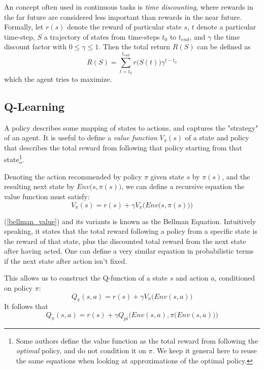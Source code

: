 An concept often used in continuous tasks is \textit{time discounting}, where rewards in the far future are considered less important than rewards in the near future. Formally, let $r(s)$ denote the reward of particular state $s$, $t$ denote a particular time-step, $S$ a trajectory of states from time-steps $t_0$ to $t_{end}$, and $\gamma$ the time discount factor with $0 \leq \gamma \leq 1$. Then the total return $R(S)$ can be defined as
\begin{equation}
    R(S) = \sum_{t=t_0}^{t_{end}}{r\big(S(t)\big)\gamma^{t-t_0}}
\end{equation}
which the agent tries to maximize.

\subsection{Q-Learning}
A policy describes some mapping of states to actions, and captures the "strategy" of an agent. It is useful to define a \textit{value function} $V_{\pi}(s)$ of a state and policy that describes the total reward from following that policy starting from that state\footnote{Some authors define the value function as the total reward from following the \textit{optimal} policy, and do not condition it on $\pi$. We keep it general here to reuse the same equations when looking at approximations of the optimal policy.}.

Denoting the action recommended by policy $\pi$ given state $s$ by $\pi(s)$, and the resulting next state by $Env\big(s, \pi(s)\big)$, we can define a recursive equation the value function must satisfy:
\begin{equation}
\label{bellman_value}
    V_{\pi}(s) = r(s) + \gamma V_{\pi} \Big(Env\big(s, \pi(s)\big)\Big)
\end{equation}

(\ref{bellman_value}) and its variants is known as the Bellman Equation. Intuitively speaking, it states that the total reward following a policy from a specific state is the reward of that state, plus the discounted total reward from the next state after having acted. One can define a very similar equation in probabilistic terms if the next state after action isn't fixed.

This allows us to construct the Q-function of a state $s$ and action $a$, conditioned on policy $\pi$:
\begin{equation}
    Q_{\pi}(s, a) = r(s) + \gamma V_{\pi}\big(Env(s, a)\big)
\end{equation}
It follows that
\begin{equation}
\label{bellman_q}
    Q_{\pi}(s, a) = r(s) + \gamma Q_{pi}\Big(Env(s, a), \pi\big(Env(s, a)\big)\Big)
\end{equation}


